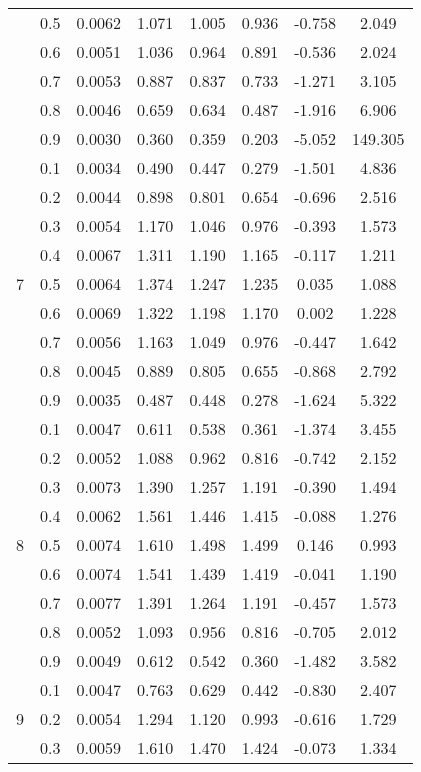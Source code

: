 \documentclass[11pt,a4paper]{report}
\begin{document}
\begin{longtable}{ | c | c || c | c | c | c | c | c | }
 & 0.5 & 0.0062 & 1.071 & 1.005 & 0.936 & -0.758 & 2.049 \\
 & 0.6 & 0.0051 & 1.036 & 0.964 & 0.891 & -0.536 & 2.024 \\
 & 0.7 & 0.0053 & 0.887 & 0.837 & 0.733 & -1.271 & 3.105 \\
 & 0.8 & 0.0046 & 0.659 & 0.634 & 0.487 & -1.916 & 6.906 \\
 & 0.9 & 0.0030 & 0.360 & 0.359 & 0.203 & -5.052 & 149.305 \\
 \hline
\multirow{9}{*}{7} & 0.1 & 0.0034 & 0.490 & 0.447 & 0.279 & -1.501 & 4.836 \\
 & 0.2 & 0.0044 & 0.898 & 0.801 & 0.654 & -0.696 & 2.516 \\
 & 0.3 & 0.0054 & 1.170 & 1.046 & 0.976 & -0.393 & 1.573 \\
 & 0.4 & 0.0067 & 1.311 & 1.190 & 1.165 & -0.117 & 1.211 \\
 & 0.5 & 0.0064 & 1.374 & 1.247 & 1.235 & 0.035 & 1.088 \\
 & 0.6 & 0.0069 & 1.322 & 1.198 & 1.170 & 0.002 & 1.228 \\
 & 0.7 & 0.0056 & 1.163 & 1.049 & 0.976 & -0.447 & 1.642 \\
 & 0.8 & 0.0045 & 0.889 & 0.805 & 0.655 & -0.868 & 2.792 \\
 & 0.9 & 0.0035 & 0.487 & 0.448 & 0.278 & -1.624 & 5.322 \\
 \hline
\multirow{9}{*}{8} & 0.1 & 0.0047 & 0.611 & 0.538 & 0.361 & -1.374 & 3.455 \\
 & 0.2 & 0.0052 & 1.088 & 0.962 & 0.816 & -0.742 & 2.152 \\
 & 0.3 & 0.0073 & 1.390 & 1.257 & 1.191 & -0.390 & 1.494 \\
 & 0.4 & 0.0062 & 1.561 & 1.446 & 1.415 & -0.088 & 1.276 \\
 & 0.5 & 0.0074 & 1.610 & 1.498 & 1.499 & 0.146 & 0.993 \\
 & 0.6 & 0.0074 & 1.541 & 1.439 & 1.419 & -0.041 & 1.190 \\
 & 0.7 & 0.0077 & 1.391 & 1.264 & 1.191 & -0.457 & 1.573 \\
 & 0.8 & 0.0052 & 1.093 & 0.956 & 0.816 & -0.705 & 2.012 \\
 & 0.9 & 0.0049 & 0.612 & 0.542 & 0.360 & -1.482 & 3.582 \\
 \hline
\multirow{9}{*}{9} & 0.1 & 0.0047 & 0.763 & 0.629 & 0.442 & -0.830 & 2.407 \\
 & 0.2 & 0.0054 & 1.294 & 1.120 & 0.993 & -0.616 & 1.729 \\
 & 0.3 & 0.0059 & 1.610 & 1.470 & 1.424 & -0.073 & 1.334 \\

\end{longtable}
\end{document}
